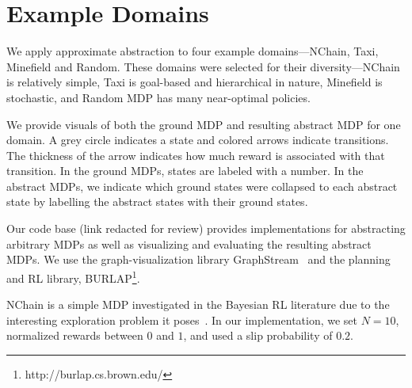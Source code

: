 \section{Example Domains}
We apply approximate abstraction to four example domains---NChain, Taxi, Minefield and Random. These domains were selected for their diversity---NChain is relatively simple, Taxi is goal-based and hierarchical in nature, Minefield is stochastic, and Random MDP has many near-optimal policies.

We provide visuals of both the ground \ac{MDP} and resulting abstract \ac{MDP} for one domain. A grey circle indicates a state and colored arrows indicate transitions. The thickness of the arrow indicates how much reward is associated with that transition. In the ground \acp{MDP}, states are labeled with a number. In the abstract \acp{MDP}, we indicate which ground states were collapsed to each abstract state by labelling the abstract states with their ground states. %

Our code base (link redacted for review) provides implementations for abstracting arbitrary \acp{MDP} as well as visualizing and evaluating the resulting abstract \acp{MDP}. We use the graph-visualization library GraphStream~\cite{graphstream} and the planning and \ac{RL} library, BURLAP\footnote{http://burlap.cs.brown.edu/}.


NChain is a simple \ac{MDP} investigated in the Bayesian \ac{RL} literature due to the interesting exploration problem it poses~\cite{dearden1998bayesian}. In our implementation, we set $N=10$, normalized rewards between $0$ and $1$, and used a slip probability of $0.2$.



